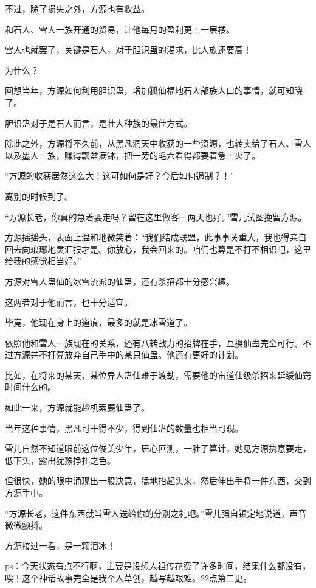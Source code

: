 \begin{this_body}
不过，除了损失之外，方源也有收益。

和石人、雪人一族开通的贸易，让他每月的盈利更上一层楼。

雪人也就罢了，关键是石人，对于胆识蛊的渴求，比人族还要高！

为什么？

回想当年，方源如何利用胆识蛊，增加狐仙福地石人部族人口的事情，就可知晓了。

胆识蛊对于是石人而言，是壮大种族的最佳方式。

除此之外，方源将不久前，从黑凡洞天中收获的一些资源，也转卖给了石人、雪人以及墨人三族，赚得瓢盆满钵，把一旁的毛六看得都要着急上火了。

“方源的收获居然这么大！这可如何是好？今后如何遏制？！”

离别的时候到了。

“方源长老，你真的急着要走吗？留在这里做客一两天也好。”雪儿试图挽留方源。

方源摇摇头，表面上温和地微笑着：“我们结成联盟，此事事关重大，我也得亲自回去向琅琊地灵汇报才是。你放心，我会回来的。咱们也算是不打不相识吧，这里给我的感觉相当好。”

方源对雪人蛊仙的冰雪流派的仙蛊，还有杀招都十分感兴趣。

这两者对于他而言，也十分适宜。

毕竟，他现在身上的道痕，最多的就是冰雪道了。

依照他和雪人一族现在的关系，还有八转战力的招牌在手，互换仙蛊完全可行。不过方源并不打算放弃自己手中的某只仙蛊。他还有更好的计划。

比如，在将来的某天，某位异人蛊仙难于渡劫，需要他的宙道仙级杀招来延缓仙窍时间什么的。

如此一来，方源就能趁机索要仙蛊了。

当年这种事情，黑凡可干得不少，得到仙蛊的数量也相当可观。

雪儿自然不知道眼前这位俊美少年，居心叵测，一肚子算计，她见方源执意要走，低下头，露出犹豫挣扎之色。

但很快，她的眼中涌现出一股决意，猛地抬起头来，然后伸出手将一件东西，交到方源手中。

“方源长老，这件东西就当雪人送给你的分别之礼吧。”雪儿强自镇定地说道，声音微微颤抖。

方源接过一看，是一颗泪冰！

ps：今天状态有点不行啊，主要是设想人祖传花费了许多时间，结果什么都没有，唉！这个神话故事完全是我个人草创，越写越艰难。22点第二更。

\end{this_body}

